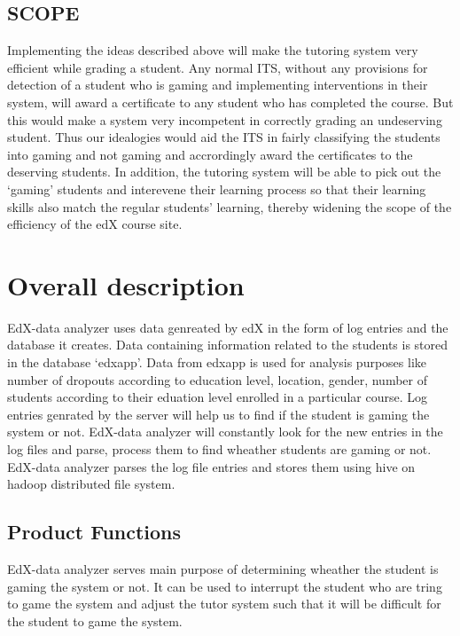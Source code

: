 \documentclass[a4paper,12pt,oneside]{sphinxmanual}
\begin{document}
\section{\textbf{SCOPE}}
\label{document:scope}
Implementing the ideas described above will make the tutoring system very efficient while grading a student. Any normal ITS, without any provisions for detection of a student who is gaming and implementing interventions in their system, will award a certificate to any student who has completed the course. But this would make a system very incompetent in correctly grading an undeserving student. Thus our idealogies would aid the ITS in fairly classifying the students into gaming and not gaming and accrordingly award the certificates to the deserving students. In addition, the tutoring system will be able to pick out the `gaming' students and interevene their learning process so that their learning skills also match the regular students' learning, thereby widening the scope of the efficiency of the edX course site.


\chapter{\textbf{Overall description}}
\label{document:overall-description}
EdX-data analyzer uses data genreated by edX  in the form of log entries and the database it creates. Data containing information related to the students is stored in the database `edxapp'. Data from  edxapp is used for analysis purposes like number of dropouts according to education level, location, gender, number of students according to their eduation level enrolled in a particular course.
Log entries genrated by the server will help us to find if the student is gaming the system or not. EdX-data analyzer will constantly look for the new entries  in the log files and parse, process  them to find wheather students are gaming or not. EdX-data analyzer parses the log file entries and stores them using hive on hadoop distributed file system.


\section{\textbf{Product Functions}}
\label{document:product-functions}
EdX-data analyzer serves main purpose of determining wheather the student is gaming the system or not. It can be used to interrupt the student who are tring to game the system and adjust the tutor system such that it will be difficult for the student to game the system.
\end{document}
